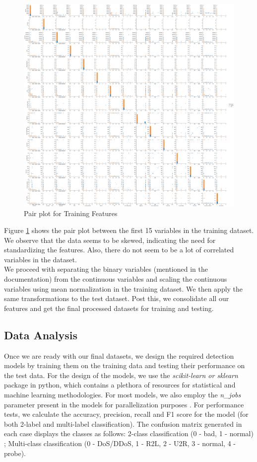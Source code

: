 \begin{figure}
	\includegraphics[width=1.0\columnwidth]{images/pairplot.png}
	\caption{Pair plot for Training Features}
	\label{F:pair}
\end{figure}
Figure \ref{F:pair} shows the pair plot between the first 15 variables in the training dataset. We observe that the data seems to be skewed, indicating the need for standardizing the features. Also, there do not seem to be a lot of correlated variables in the dataset.\\
We proceed with separating the binary variables (mentioned in the documentation) from the continuous variables and scaling the continuous variables using mean normalization in the training dataset. We then apply the same transformations to the test dataset. Post this, we consolidate all our features and get the final processed datasets for training and testing.

\subsection{Data Analysis}
Once we are ready with our final datasets, we design the required detection models by training them on the training data and testing their performance on the test data. For the design of the models, we use the {\em scikit-learn or sklearn} package in python, which contains a plethora of resources for statistical and machine learning methodologies. For most models, we also employ the {\em n{\_}jobs} parameter present in the models for parallelization purposes \cite{scikit12}. For performance tests, we calculate the accuracy, precision, recall and F1 score for the model (for both 2-label and multi-label classification). The confusion matrix generated in each case displays the classes as follows: 2-class classification (0 - bad, 1 - normal) ; Multi-class classification (0 - DoS/DDoS, 1 - R2L, 2 - U2R, 3 - normal, 4 - probe).

